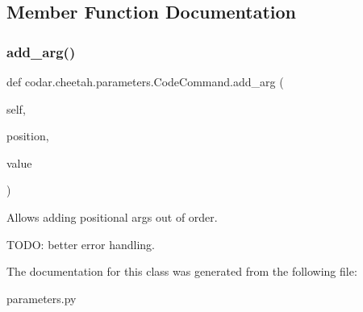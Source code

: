 \subsection{Member Function Documentation}
\mbox{\label{classcodar_1_1cheetah_1_1parameters_1_1_code_command_a869d18602cb7e516157c871a6a80527e}} 
\subsubsection{\texorpdfstring{add\+\_\+arg()}{add\_arg()}}
{\footnotesize\ttfamily def codar.\+cheetah.\+parameters.\+Code\+Command.\+add\+\_\+arg (\begin{DoxyParamCaption}\item[{}]{self,  }\item[{}]{position,  }\item[{}]{value }\end{DoxyParamCaption})}

\begin{DoxyVerb}Allows adding positional args out of order.

TODO: better error handling.
\end{DoxyVerb}
 

The documentation for this class was generated from the following file\+:\begin{DoxyCompactItemize}
\item 
parameters.\+py\end{DoxyCompactItemize}
